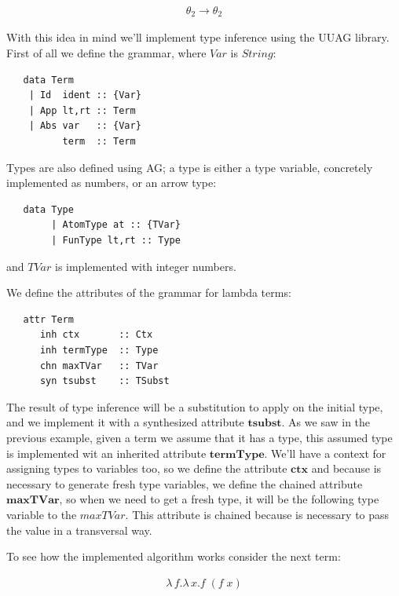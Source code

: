 \documentclass[a4paper,10pt]{article}
\begin{document}
  \begin{align*}
    {\theta_2 \rightarrow \theta_2}
  \end{align*} 
 
 \medskip
 
  With this idea in mind we'll implement type inference using the UUAG library. 
  First of all we define the grammar, where $Var$ is $String$:
  
  \begin{lstlisting}
   data Term
	| Id  ident :: {Var}
	| App lt,rt :: Term
	| Abs var   :: {Var}
	      term  :: Term
  \end{lstlisting}
  
  Types are also defined using AG; a type is either a type variable, 
  concretely implemented as numbers, or an arrow type:
  
  \begin{lstlisting}
   data Type
        | AtomType at :: {TVar}
        | FunType lt,rt :: Type
  \end{lstlisting}

  \indent and $TVar$ is implemented with integer numbers.
  \medskip
  
  We define the attributes of the grammar for lambda terms:
  
  \begin{lstlisting}
   attr Term 
      inh ctx       :: Ctx
      inh termType  :: Type
      chn maxTVar   :: TVar
      syn tsubst    :: TSubst
  \end{lstlisting}

  The result of type inference will be a substitution to apply on the initial type, and we implement it with a
  synthesized attribute $\mathbf{tsubst}$. As we saw in the previous example, given a term we assume that it has
  a type, this assumed type is implemented wit an inherited attribute $\mathbf{termType}$. We'll have a context
  for assigning types to variables too, so we define the attribute $\mathbf{ctx}$ and because is necessary 
  to generate fresh type variables, we define the chained attribute $\mathbf{maxTVar}$, so when we need
  to get a fresh type, it will be the following type variable to the $maxTVar$. This attribute is chained
  because is necessary to pass the value in a transversal way.
  
  To see how the implemented algorithm works consider the next term:
  
 \begin{align*}
    \lambda\,f.\lambda\,x.f\;(f\;x)
 \end{align*}
\end{document}
